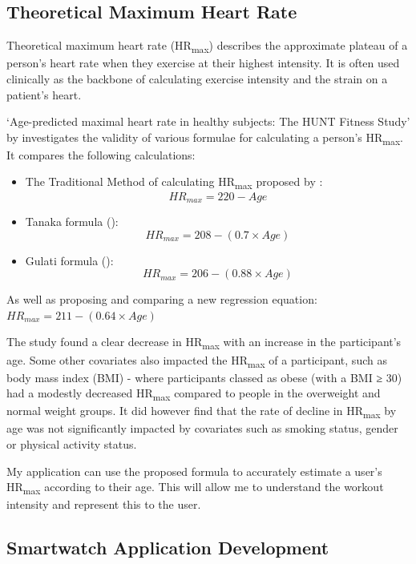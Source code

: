 \documentclass{l4proj}
\begin{document}
\subsection{Theoretical Maximum Heart Rate}
\label{sec:backgroundmaxhr}

Theoretical maximum heart rate (HR\textsubscript{max}) describes the approximate plateau of a person's heart rate when they exercise at their highest intensity. It is often used clinically as the backbone of calculating exercise intensity and the strain on a patient's heart. 

‘Age-predicted maximal heart rate in healthy subjects: The HUNT Fitness Study’ by \cite{NesHRmax} investigates the validity of various formulae for calculating a person’s HR\textsubscript{max}. It compares the following calculations:

\begin{itemize}
    \item The Traditional Method of calculating HR\textsubscript{max} proposed by \cite{foxHRmax}: $$HR_{max} = 220 - Age$$
    \item Tanaka formula (\cite{TANAKAHRmax}): $$HR_{max} = 208 - (0.7 \times Age)$$
    \item Gulati formula (\cite{GulatiHRmax}): $$HR_{max} = 206 - (0.88 \times Age)$$
\end{itemize}

As well as proposing and comparing a new regression equation: $HR_{max} = 211 - (0.64 \times Age)$

The study found a clear decrease in HR\textsubscript{max} with an increase in the participant’s age. Some other covariates also impacted the HR\textsubscript{max} of a participant, such as body mass index (BMI) - where participants classed as obese (with a BMI ≥ 30) had a modestly decreased HR\textsubscript{max} compared to people in the overweight and normal weight groups. It did however find that the rate of decline in HR\textsubscript{max} by age was not significantly impacted by covariates such as smoking status, gender or physical activity status.

My application can use the proposed formula to accurately estimate a user's HR\textsubscript{max} according to their age. This will allow me to understand the workout intensity and represent this to the user.

\subsection{Smartwatch Application Development}
\label{sec:backgroundwatchdev}
\end{document}

